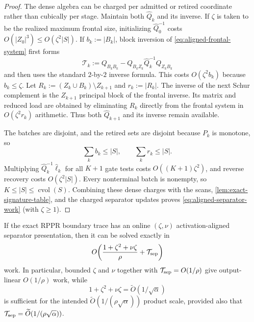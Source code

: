 \begin{proof}
The dense algebra can be charged per admitted or retired coordinate rather
than cubically per stage.  Maintain both $\widehat Q_k$ and its inverse.  If
$\zeta$ is taken to be the realized maximum frontal size, initializing
$\widehat Q_0^{-1}$ costs
$O(|Z_0|^3)\leq O(\zeta^2|S|)$.  If
$b_k:=|B_k|$, block inversion of \cref{eq:aligned-frontal-system} first forms
\begin{equation*}
 \mathcal T_k
 :=Q_{B_kB_k}
   -Q_{B_kZ_k}\widehat Q_k^{-1}Q_{Z_kB_k}
\end{equation*}
and then uses the standard $2$-by-$2$ inverse formula.  This costs
$O(\zeta^2b_k)$ because $b_k\leq\zeta$.  Let
$R_k:=(Z_k\cup B_k)\setminus Z_{k+1}$ and $r_k:=|R_k|$.
The inverse of the next Schur complement is the $Z_{k+1}$ principal block of
the frontal inverse.  Its matrix and reduced load are obtained by eliminating
$R_k$ directly from the frontal system in $O(\zeta^2r_k)$ arithmetic.  Thus
both $\widehat Q_{k+1}$ and its inverse remain available.

The batches are disjoint, and the retired sets are disjoint because $P_k$ is
monotone, so
\begin{equation*}
 \sum_k b_k\leq|S|,
 \qquad
 \sum_k r_k\leq|S|.
\end{equation*}
Multiplying $\widehat Q_k^{-1}\widehat\ell_k$ for all $K+1$ gate tests costs
$O((K+1)\zeta^2)$, and reverse recovery costs $O(\zeta^2|S|)$.  Every
nonterminal batch is nonempty, so
$K\leq|S|\leq\operatorname{cvol}(S)$.  Combining these dense charges with
the scans, \cref{lem:exact-signature-table}, and the charged separator updates
proves
\cref{eq:aligned-separator-work} (with $\zeta\geq1$).
\end{proof}

\begin{corollary}
\label{cor:rppr-response-complexity}
If the exact RPPR boundary trace has an online $(\zeta,\nu)$
activation-aligned separator presentation, then it can be solved exactly in
\begin{equation}
 O\!\left(
  \frac{1+\zeta^2+\nu\zeta}{\rho}+\mathcal T_{\rm sep}
 \right)
 \label{eq:rppr-response-complexity}
\end{equation}
work.  In particular, bounded $\zeta$ and $\nu$ together with
$\mathcal T_{\rm sep}=O(1/\rho)$ give output-linear $O(1/\rho)$ work, while
\begin{equation}
 1+\zeta^2+\nu\zeta
 =\widetilde O(1/\sqrt\alpha)
 \label{eq:response-product-criterion}
\end{equation}
is sufficient for the intended
$\widetilde O(1/(\rho\sqrt\alpha))$ product scale, provided also that
$\mathcal T_{\rm sep}=\widetilde O(1/(\rho\sqrt\alpha))$.
\end{corollary}

